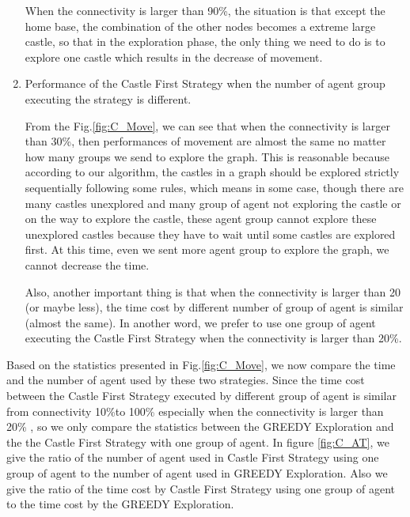 \begin{enumerate}
When the connectivity is larger than 90\%, the situation is that except the home base, the combination of the other nodes becomes a extreme large castle, so that in the exploration phase, the only thing we need to do is to explore one castle which results in the decrease of movement.  

\item Performance of the Castle First Strategy when the number of agent group executing the strategy is different. 

From the Fig.\ref{fig:C_Move}, we can see that when the connectivity is larger than 30\%, then performances of movement are almost the same no matter how many groups we send to explore the graph. This is reasonable because according to our algorithm, the castles in a graph should be explored strictly sequentially following some rules, which means in some case, though there are many castles unexplored and many group of agent not exploring the castle or on the way to explore the castle, these agent group cannot explore these unexplored castles because they have to wait until some castles are explored first. At this time, even we sent more agent group to explore the graph, we cannot decrease the time.

Also, another important thing is that when the connectivity is larger than 20 (or maybe less), the time cost by different number of group of agent is similar (almost the same). In another word, we prefer to use one group of agent executing the Castle First Strategy when the connectivity is larger than 20\%. 


\end{enumerate} 

Based on the statistics presented in Fig.\ref{fig:C_Move}, we now compare the time and the number of agent used by these two strategies. Since the time cost between the Castle First Strategy executed by different group of agent is similar from connectivity 10\%to 100\% especially when the connectivity is larger than 20\% , so we only compare the statistics between the GREEDY Exploration and the the Castle First Strategy with one group of agent. 
In figure \ref{fig:C_AT}, we give the ratio of the number of agent used in Castle First Strategy using one group of agent to the number of agent used in GREEDY Exploration. Also we give the ratio of the time cost by Castle First Strategy using one group of agent to the time cost by the GREEDY Exploration. 

